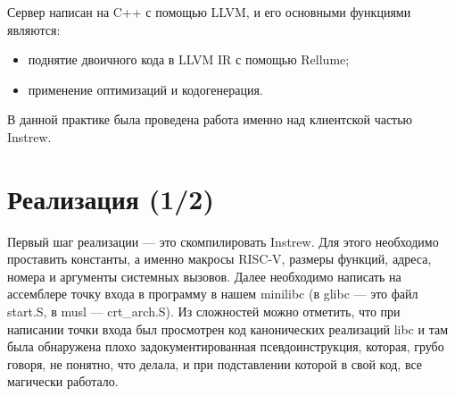 Сервер написан на C++ с помощью LLVM, и его основными функциями являются:
\begin{itemize}
    \item поднятие двоичного кода в LLVM IR с помощью Rellume;
    \item применение оптимизаций и кодогенерация.
\end{itemize}

В данной практике была проведена работа именно над клиентской частью Instrew.

\section{Реализация (1/2)}
Первый шаг реализации --- это скомпилировать Instrew. Для этого необходимо проставить константы, а именно макросы RISC-V, размеры функций, адреса, номера и аргументы системных вызовов. Далее необходимо написать на ассемблере точку входа в программу в нашем minilibc (в glibc --- это файл start.S, в musl --- crt\_arch.S). Из сложностей можно отметить, что при написании точки входа был просмотрен код канонических реализаций libc и там была обнаружена плохо задокументированная псевдоинструкция, которая, грубо говоря, не понятно, что делала, и при подставлении которой в свой код, все магически работало.

